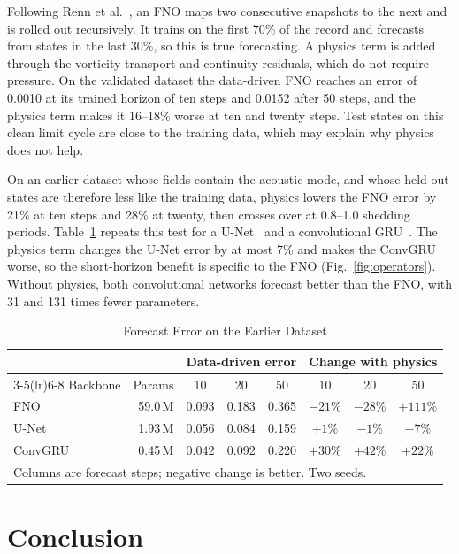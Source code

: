 \documentclass[conference]{IEEEtran}
\begin{document}
Following Renn et al.~\cite{renn2023}, an FNO maps two consecutive snapshots
to the next and is rolled out recursively. It trains on the first 70\% of the
record and forecasts from states in the last 30\%, so this is true
forecasting. A physics term is added through the vorticity-transport and
continuity residuals, which do not require pressure. On the validated dataset
the data-driven FNO reaches an error of 0.0010 at its trained horizon of ten
steps and 0.0152 after 50 steps, and the physics term makes it 16--18\% worse
at ten and twenty steps. Test states on this clean limit cycle are close to
the training data, which may explain why physics does not help.

On an earlier dataset whose fields contain the acoustic mode, and whose
held-out states are therefore less like the training data, physics lowers the
FNO error by 21\% at ten steps and 28\% at twenty, then crosses over at
0.8--1.0 shedding periods. Table~\ref{tab:backbones} repeats this test for a
U-Net~\cite{ronneberger2015} and a convolutional GRU~\cite{ren2022phycrnet}.
The physics term changes the U-Net error by at most 7\% and makes the ConvGRU
worse, so the short-horizon benefit is specific to the FNO
(Fig.~\ref{fig:operators}). Without physics, both convolutional networks
forecast better than the FNO, with 31 and 131 times fewer parameters.

\begin{table}[!t]
\centering
\caption{Forecast Error on the Earlier Dataset}
\label{tab:backbones}
\setlength{\tabcolsep}{2.6pt}
\begin{tabular}{lrcccccc}
\toprule
 & & \multicolumn{3}{c}{Data-driven error} & \multicolumn{3}{c}{Change with physics} \\
\cmidrule(lr){3-5}\cmidrule(lr){6-8}
Backbone & Params & 10 & 20 & 50 & 10 & 20 & 50 \\
\midrule
FNO     & 59.0\,M & 0.093 & 0.183 & 0.365 & $-21\%$ & $-28\%$ & $+111\%$ \\
U-Net   & 1.93\,M & 0.056 & 0.084 & 0.159 & $+1\%$  & $-1\%$  & $-7\%$ \\
ConvGRU & 0.45\,M & 0.042 & 0.092 & 0.220 & $+30\%$ & $+42\%$ & $+22\%$ \\
\bottomrule
\multicolumn{8}{p{0.92\columnwidth}}{\footnotesize Columns are forecast steps;
negative change is better. Two seeds.}
\end{tabular}
\end{table}


\section{Conclusion}
\end{document}
